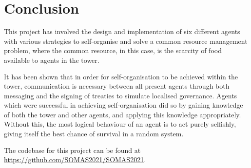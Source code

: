 \chapter{Conclusion}\label{conclusion}

This project has involved the design and implementation of six different agents with various strategies to self-organise and solve a common resource management problem, where the common resource, in this case, is the scarcity of food available to agents in the tower.

It has been shown that in order for self-organisation to be achieved within the tower, communication is necessary between all present agents through both messaging and the signing of treaties to simulate localised governance. Agents which were successful in achieving self-organisation did so by gaining knowledge of both the tower and other agents, and applying this knowledge appropriately. Without this, the most logical behaviour of an agent is to act purely selfishly, giving itself the best chance of survival in a random system.

The codebase for this project can be found at \url{https://github.com/SOMAS2021/SOMAS2021}.